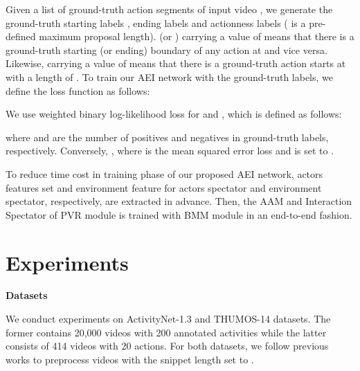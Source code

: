 \documentclass{bmvc2k}
\begin{document}
Given a list of  ground-truth action segments  of input video , we generate the ground-truth starting labels , ending labels  and actionness labels  ( is a pre-defined maximum proposal length).  (or ) carrying a value of  means that there is a ground-truth starting (or ending) boundary of any action at  and vice versa. Likewise,  carrying a value of  means that there is a ground-truth action starts at  with a length of .
To train our AEI network with the ground-truth labels, we define the loss function  as follows:

We use weighted binary log-likelihood loss  for  and , which is defined as follows:


where  and  are the number of positives and negatives in ground-truth labels, respectively. Conversely, , where  is the mean squared error loss and  is set to .

To reduce time cost in training phase of our proposed AEI network, actors features set  and environment feature  for actors spectator and environment spectator, respectively, are extracted in advance. Then, the AAM and Interaction Spectator of PVR module is trained with BMM module in an end-to-end fashion.

\section{Experiments}
\noindent
\textbf{Datasets}

\noindent
We conduct experiments on ActivityNet-1.3 \cite{caba2015activitynet} and THUMOS-14 \cite{THUMOS14} datasets. The former contains 20,000 videos with 200 annotated activities while the latter consists of 414 videos with 20 actions. For both datasets, we follow previous works \cite{lin2018bsn,bmn, dbg} to preprocess videos with the snippet length set to .
\end{document}
